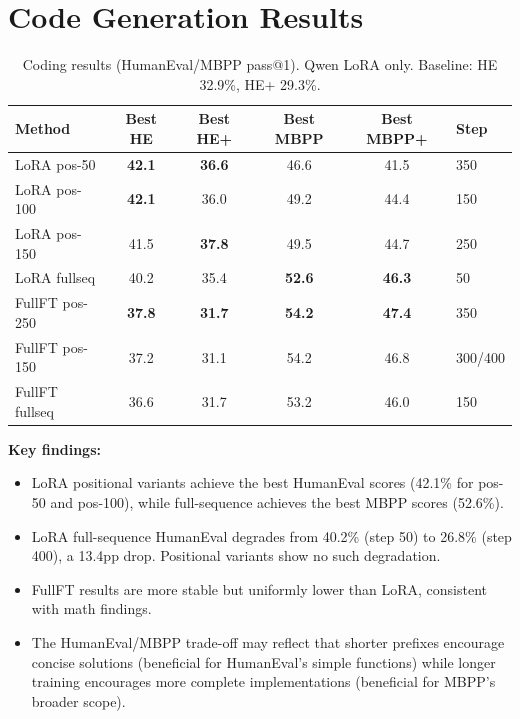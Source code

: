 \documentclass[10pt]{article}
\begin{document}
\section{Code Generation Results}
\label{app:coding}

\begin{table}[h]
\centering
\caption{Coding results (HumanEval/MBPP pass@1). Qwen LoRA only. Baseline: HE 32.9\%, HE+ 29.3\%.}
\small
\begin{tabular}{@{}lccccl@{}}
\toprule
\textbf{Method} & \textbf{Best HE} & \textbf{Best HE+} & \textbf{Best MBPP} & \textbf{Best MBPP+} & \textbf{Step} \\
\midrule
LoRA pos-50   & \textbf{42.1} & \textbf{36.6} & 46.6 & 41.5 & 350 \\
LoRA pos-100  & \textbf{42.1} & 36.0          & 49.2 & 44.4 & 150 \\
LoRA pos-150  & 41.5          & \textbf{37.8} & 49.5 & 44.7 & 250 \\
LoRA fullseq  & 40.2          & 35.4          & \textbf{52.6} & \textbf{46.3} & 50 \\
\midrule
FullFT pos-250 & \textbf{37.8} & \textbf{31.7} & \textbf{54.2} & \textbf{47.4} & 350 \\
FullFT pos-150 & 37.2          & 31.1          & 54.2 & 46.8 & 300/400 \\
FullFT fullseq & 36.6          & 31.7          & 53.2 & 46.0 & 150 \\
\bottomrule
\end{tabular}
\end{table}

\textbf{Key findings:}
\begin{itemize}
\item LoRA positional variants achieve the best HumanEval scores (42.1\% for pos-50 and pos-100), while full-sequence achieves the best MBPP scores (52.6\%).
\item LoRA full-sequence HumanEval degrades from 40.2\% (step 50) to 26.8\% (step 400), a 13.4pp drop. Positional variants show no such degradation.
\item FullFT results are more stable but uniformly lower than LoRA, consistent with math findings.
\item The HumanEval/MBPP trade-off may reflect that shorter prefixes encourage concise solutions (beneficial for HumanEval's simple functions) while longer training encourages more complete implementations (beneficial for MBPP's broader scope).
\end{itemize}
\end{document}
